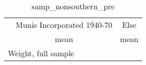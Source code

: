 \begin{table}[htbp]\centering
\def\sym#1{\ifmmode^{#1}\else\(^{#1}\)\fi}
\caption{samp\_nonsouthern\_pre \label{tab1}}
\begin{tabular}{l*{2}{c}}
\toprule
                    &\multicolumn{1}{c}{Munis Incorporated 1940-70}&\multicolumn{1}{c}{Else}\\
                    &        mean&        mean\\
\midrule
\bottomrule
\multicolumn{3}{l}{\footnotesize Weight, full sample}\\
\end{tabular}
\end{table}
